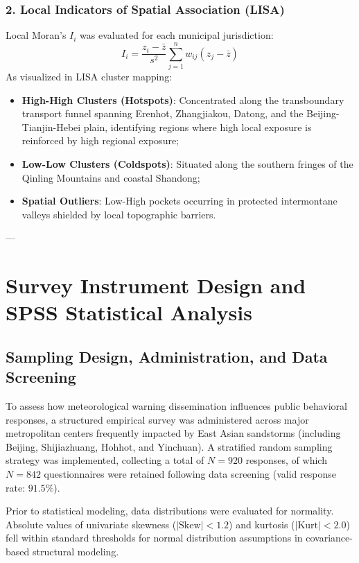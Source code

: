 \subsubsection{2. Local Indicators of Spatial Association (LISA)}
Local Moran's $I_i$ was evaluated for each municipal jurisdiction:
\begin{equation}
\label{eq:local_lisa}
I_i = \frac{z_i - \bar{z}}{s^2} \sum_{j=1}^n w_{ij} (z_j - \bar{z})
\end{equation}
As visualized in LISA cluster mapping:
\begin{itemize}
    \item \textbf{High-High Clusters (Hotspots)}: Concentrated along the transboundary transport funnel spanning Erenhot, Zhangjiakou, Datong, and the Beijing-Tianjin-Hebei plain, identifying regions where high local exposure is reinforced by high regional exposure;
    \item \textbf{Low-Low Clusters (Coldspots)}: Situated along the southern fringes of the Qinling Mountains and coastal Shandong;
    \item \textbf{Spatial Outliers}: Low-High pockets occurring in protected intermontane valleys shielded by local topographic barriers.
\end{itemize}

---

\section{Survey Instrument Design and SPSS Statistical Analysis}
\label{sec:spss_survey}

\subsection{Sampling Design, Administration, and Data Screening}
\label{subsec:survey_sampling}

To assess how meteorological warning dissemination influences public behavioral responses, a structured empirical survey was administered across major metropolitan centers frequently impacted by East Asian sandstorms (including Beijing, Shijiazhuang, Hohhot, and Yinchuan). A stratified random sampling strategy was implemented, collecting a total of $N=920$ responses, of which $N=842$ questionnaires were retained following data screening (valid response rate: $91.5\%$).

Prior to statistical modeling, data distributions were evaluated for normality. Absolute values of univariate skewness ($|\text{Skew}| < 1.2$) and kurtosis ($|\text{Kurt}| < 2.0$) fell within standard thresholds for normal distribution assumptions in covariance-based structural modeling.

